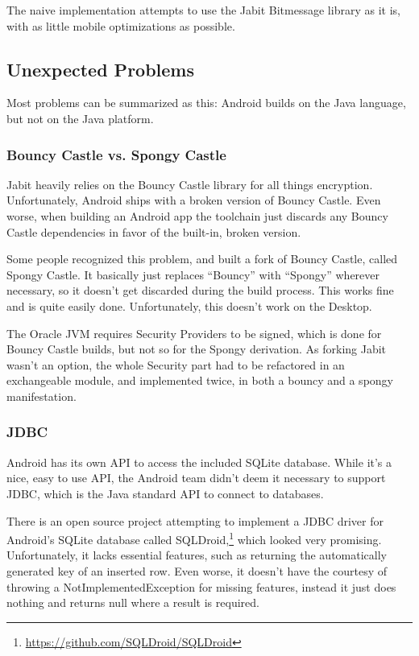 \documentclass{bfh}
\begin{document}
  The naive implementation attempts to use the Jabit Bitmessage library as it is, with as little mobile optimizations as possible.

  \subsection{Unexpected Problems}
  Most problems can be summarized as this: Android builds on the Java language, but not on the Java platform.
  
  \subsubsection{Bouncy Castle vs. Spongy Castle}
  Jabit heavily relies on the Bouncy Castle library for all things encryption. Unfortunately, Android ships with a broken version of Bouncy Castle. Even worse, when building an Android app the toolchain just discards any Bouncy Castle dependencies in favor of the built-in, broken version.

  Some people recognized this problem, and built a fork of Bouncy Castle, called Spongy Castle. It basically just replaces “Bouncy” with “Spongy” wherever necessary, so it doesn’t get discarded during the build process. This works fine and is quite easily done. Unfortunately, this doesn’t work on the Desktop.

  The Oracle JVM requires Security Providers to be signed, which is done for Bouncy Castle builds, but not so for the Spongy derivation. As forking Jabit wasn’t an option, the whole Security part had to be refactored in an exchangeable module, and implemented twice, in both a bouncy and a spongy manifestation.

  \subsubsection{JDBC}
  Android has its own API to access the included SQLite database. While it’s a nice, easy to use API, the Android team didn’t deem it necessary to support JDBC, which is the Java standard API to connect to databases.

  There is an open source project attempting to implement a JDBC driver for Android’s SQLite database called SQLDroid,\footnote{\url{https://github.com/SQLDroid/SQLDroid}} which looked very promising. Unfortunately, it lacks essential features, such as returning the automatically generated key of an inserted row. Even worse, it doesn't have the courtesy of throwing a NotImplementedException for missing features, instead it just does nothing and returns null where a result is required.
\end{document}
